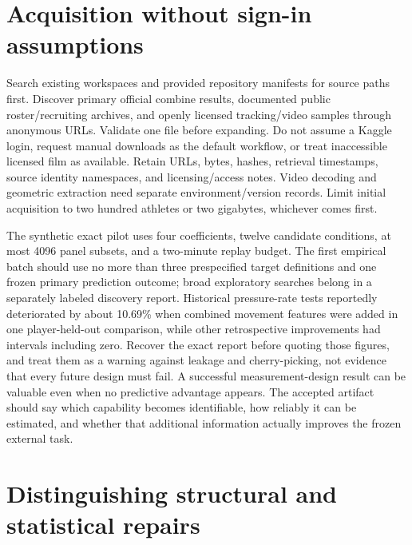 \documentclass[
  11pt,
  a4paper,
]{report}
\begin{document}
\hypertarget{acquisition-without-sign-in-assumptions}{%
\section{Acquisition without sign-in
assumptions}\label{acquisition-without-sign-in-assumptions}}

Search existing workspaces and provided repository manifests for source
paths first. Discover primary official combine results, documented
public roster/recruiting archives, and openly licensed tracking/video
samples through anonymous URLs. Validate one file before expanding. Do
not assume a Kaggle login, request manual downloads as the default
workflow, or treat inaccessible licensed film as available. Retain URLs,
bytes, hashes, retrieval timestamps, source identity namespaces, and
licensing/access notes. Video decoding and geometric extraction need
separate environment/version records. Limit initial acquisition to two
hundred athletes or two gigabytes, whichever comes first.

The synthetic exact pilot uses four coefficients, twelve candidate
conditions, at most 4096 panel subsets, and a two-minute replay budget.
The first empirical batch should use no more than three prespecified
target definitions and one frozen primary prediction outcome; broad
exploratory searches belong in a separately labeled discovery report.
Historical pressure-rate tests reportedly deteriorated by about 10.69\%
when combined movement features were added in one player-held-out
comparison, while other retrospective improvements had intervals
including zero. Recover the exact report before quoting those figures,
and treat them as a warning against leakage and cherry-picking, not
evidence that every future design must fail. A successful
measurement-design result can be valuable even when no predictive
advantage appears. The accepted artifact should say which capability
becomes identifiable, how reliably it can be estimated, and whether that
additional information actually improves the frozen external task.

\hypertarget{distinguishing-structural-and-statistical-repairs}{%
\section{Distinguishing structural and statistical
repairs}\label{distinguishing-structural-and-statistical-repairs}}
\end{document}
